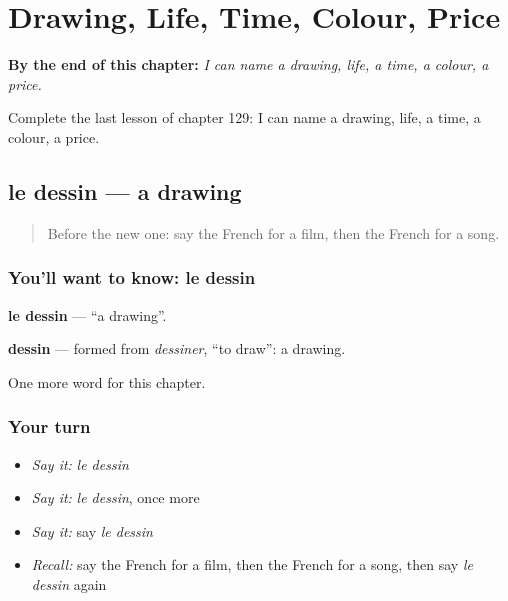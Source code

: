 
\chapter{Drawing, Life, Time, Colour, Price}
\label{ch:fr-drawing-life-time-colour-price}

\begin{chapteropening}
\textbf{By the end of this chapter:} \emph{I can name a drawing, life, a time, a colour, a price.}

Complete the last lesson of chapter 129: I can name a drawing, life, a time, a colour, a price.
\end{chapteropening}

\section[le dessin]{le dessin — a drawing}

\label{lesson:FR-C129-dessin}



\begin{quote}
Before the new one: say the French for a film, then the French for a song.
\end{quote}

\subsection*{You'll want to know: le dessin}
\textbf{le dessin} — \textquotedblleft{}a drawing\textquotedblright{}.

\begin{cousinweb}
\textbf{dessin} — formed from \emph{dessiner}, \textquotedblleft{}to draw\textquotedblright{}: a drawing.
\end{cousinweb}

\begin{grammarlens}[title={What you've built}]
One more word for this chapter.
\end{grammarlens}

\subsection*{Your turn}
\begin{itemize}
\raggedright
  \item \emph{Say it:} \emph{le dessin}
  \item \emph{Say it:} \emph{le dessin}, once more
  \item \emph{Say it:} say \emph{le dessin}
  \item \emph{Recall:} say the French for a film, then the French for a song, then say \emph{le dessin} again
\end{itemize}


